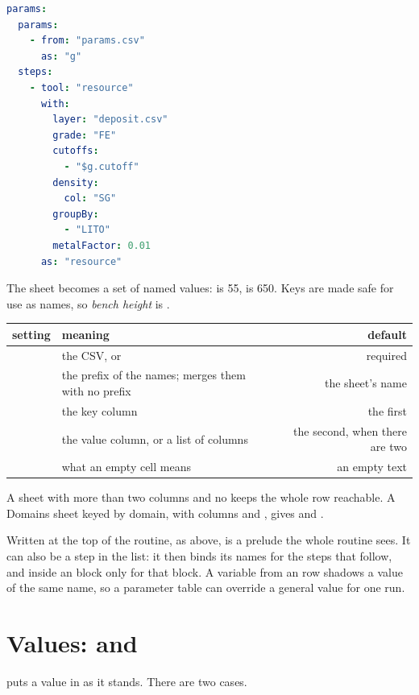 \begin{lstlisting}[language=yaml]
params:
  params:
    - from: "params.csv"
      as: "g"
  steps:
    - tool: "resource"
      with:
        layer: "deposit.csv"
        grade: "FE"
        cutoffs:
          - "$g.cutoff"
        density:
          col: "SG"
        groupBy:
          - "LITO"
        metalFactor: 0.01
      as: "resource"
\end{lstlisting}

The sheet becomes a set of named values:  is 55,  is 650. Keys are made safe for use as names, so \emph{bench height} is .

\begin{tabularx}{\linewidth}{@{}lMD@{}}\toprule
setting & meaning & default \\ \midrule
{} & the CSV, or  & required \\
 & the prefix of the names;  merges them with no prefix & the sheet's name \\
 & the key column & the first \\
 & the value column, or a list of columns & the second, when there are two \\
 & what an empty cell means & an empty text \\
\bottomrule
\end{tabularx}

A sheet with more than two columns and no  keeps the whole row reachable. A Domains sheet keyed by domain, with columns  and , gives  and .

Written at the top of the routine, as above,  is a prelude the whole routine sees. It can also be a step in the list: it then binds its names for the steps that follow, and inside an  block only for that block. A variable from an  row shadows a  value of the same name, so a parameter table can override a general value for one run.

\section{Values: \texorpdfstring{ and }{\$name and \$\{…\}}}\label{sec:routines-values}
 puts a value in as it stands. There are two cases.

